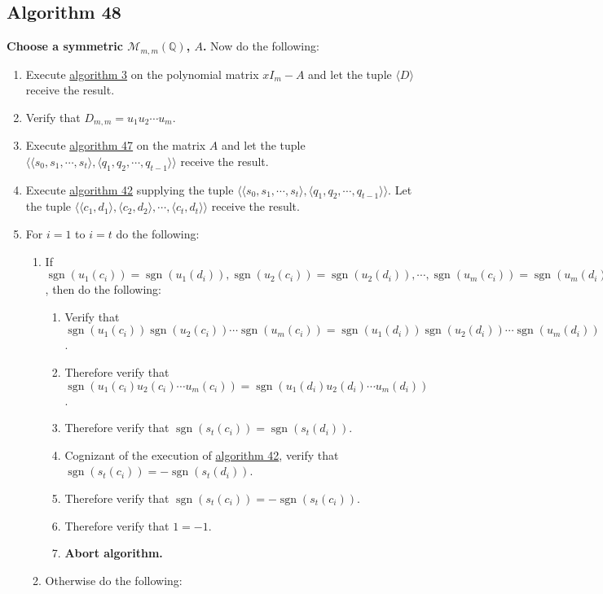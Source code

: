 \documentclass[twocolumn]{article}
\DeclareMathOperator{\sgn}{sgn}
\begin{document}
		\subsection{Algorithm 48}\label{sec:algorithm 48}
			\textbf{Choose a symmetric $\mathcal{M}_{m,m}(\mathbb{Q})$, $A$.} Now do the following:
			\begin{enumerate}
				\item Execute \hyperref[sec:algorithm 3]{algorithm 3} on the polynomial matrix $xI_m-A$ and let the tuple $\langle D\rangle$ receive the result.
				\item Verify that $D_{m,m}=u_1u_2\cdots u_m$.
				\item Execute \hyperref[sec:algorithm 47]{algorithm 47} on the matrix $A$ and let the tuple $\langle \langle s_0,s_1,\cdots,s_t\rangle,\langle q_1,q_2,\cdots,q_{t-1}\rangle\rangle$ receive the result.
				\item Execute \hyperref[sec:algorithm 42]{algorithm 42} supplying the tuple $\langle \langle s_0,s_1,\cdots,s_t\rangle,\langle q_1,q_2,\cdots,q_{t-1}\rangle\rangle$. Let the tuple $\langle\langle c_1,d_1\rangle,\langle c_2,d_2\rangle,\cdots,\langle c_t,d_t\rangle\rangle$ receive the result.
				\item For $i=1$ to $i=t$ do the following:
				\begin{enumerate}
					\item If $\sgn(u_1(c_i))=\sgn(u_1(d_i)), \sgn(u_2(c_i))=\sgn(u_2(d_i)), \cdots, \sgn(u_m(c_i))=\sgn(u_m(d_i))$, then do the following:
					\begin{enumerate}
						\item Verify that $\sgn(u_1(c_i))\sgn(u_2(c_i))\cdots\sgn(u_m(c_i))=\sgn(u_1(d_i))\sgn(u_2(d_i))\cdots\sgn(u_m(d_i))$.
						\item Therefore verify that $\sgn(u_1(c_i)u_2(c_i)\cdots u_m(c_i))=\sgn(u_1(d_i)u_2(d_i)\cdots u_m(d_i))$.
						\item Therefore verify that $\sgn(s_t(c_i))=\sgn(s_t(d_i))$.
						\item Cognizant of the execution of \hyperref[sec:algorithm 42]{algorithm 42}, verify that $\sgn(s_t(c_i))=-\sgn(s_t(d_i))$.
						\item Therefore verify that $\sgn(s_t(c_i))=-\sgn(s_t(c_i))$.
						\item Therefore verify that $1=-1$.
						\item \textbf{Abort algorithm.}
					\end{enumerate}
					\item Otherwise do the following:

\end{enumerate}
\end{enumerate}
\end{document}
